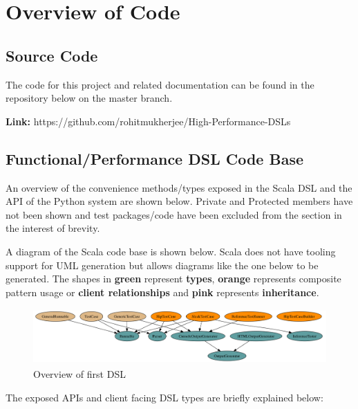 \section{Overview of Code}

\subsection{Source Code}
The code for this project and related documentation can be found in the repository below on the master branch.
\bigskip

\noindent
\textbf{Link:} https://github.com/rohitmukherjee/High-Performance-DSLs

\subsection{Functional/Performance DSL Code Base}
An overview of the convenience methods/types exposed in the Scala DSL and the API of the Python system are shown below. Private and Protected members have not been shown and test packages/code have been excluded from the section in the interest of brevity.
\bigskip

\noindent
A diagram of the Scala code base is shown below. Scala does not have tooling support for UML generation but allows diagrams like the one below to be generated. The shapes in \textbf{green} represent \textbf{types}, \textbf{orange} represents composite pattern usage or \textbf{client relationships} and \textbf{pink} represents \textbf{inheritance}.

\begin{figure}[H]
  \centering
    \includegraphics[height=80px]{figures/scala_uml.png}
  \caption{Overview of first DSL}
\end{figure}

\noindent
The exposed APIs and client facing DSL types are briefly explained below:

